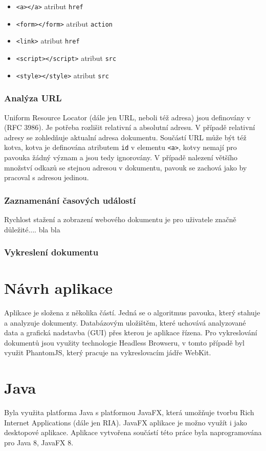 \begin{enumerate}
\begin{itemize}
	\item \texttt{<a></a>} atribut \texttt{href}
	\item \texttt{<form></form>} atribut \texttt{action}
	\item \texttt{<link>} atribut \texttt{href}
	\item \texttt{<script></script>} atribut \texttt{src}
	\item \texttt{<style></style>} atribut \texttt{src}
\end{itemize}

\subsection{Analýza URL}
Uniform Resource Locator (dále jen URL, neboli též adresa) jsou definovány v (RFC 3986). Je potřeba rozlišit relativní a absolutní adresu. V případě relativní adresy se zohledňuje aktualní adresa dokumentu. Součástí URL může být též kotva, kotva je definována atributem \texttt{id} v elementu \texttt{<a>}, kotvy nemají pro pavouka žádný význam a jsou tedy ignorovány. V případě nalezení většího množství odkazů se stejnou adresou v dokumentu, pavouk se zachová jako by pracoval s adresou jedinou.

\subsection{Zaznamenání časových událostí}
Rychlost stažení a zobrazení webového dokumentu je pro uživatele značně důležité.... bla bla


\subsection{Vykreslení dokumentu}


\newpage
\chapter{Návrh aplikace}
Aplikace je složena z několika částí. Jedná se o algoritmus pavouka, který stahuje a analyzuje dokumenty. Databázovým uložištěm, které uchovává analyzované data a grafická nadstavba (GUI) přes kterou je aplikace řízena. Pro vykreslování dokumentů jsou využity technologie Headless Browseru, v tomto případě byl využit PhantomJS, který pracuje na vykreslovacím jádře WebKit.

\chapter{Java}
Byla využita platforma Java s platformou JavaFX, která umožňuje tvorbu Rich Internet Applications (dále jen RIA). JavaFX aplikace je možno využít i jako desktopové aplikace. Aplikace vytvořena součástí této práce byla naprogramována pro Java 8, JavaFX 8.


\end{enumerate}
